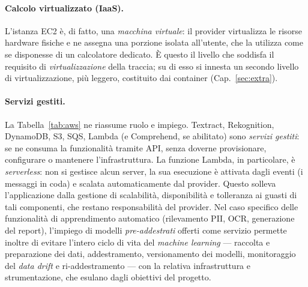 \documentclass[11pt,a4paper]{article}
\begin{document}
\paragraph{Calcolo virtualizzato (IaaS).} L'istanza EC2 è, di fatto, una \emph{macchina
virtuale}: il provider virtualizza le risorse hardware fisiche e ne assegna una
porzione isolata all'utente, che la utilizza come se disponesse di un calcolatore
dedicato. È questo il livello che soddisfa il requisito di \emph{virtualizzazione}
della traccia; su di esso si innesta un secondo livello di virtualizzazione, più
leggero, costituito dai container (Cap.~\ref{sec:extra}).

\paragraph{Servizi gestiti.} La Tabella~\ref{tab:aws} ne riassume ruolo e impiego.
Textract, Rekognition, DynamoDB, S3, SQS, Lambda (e Comprehend, se abilitato) sono
\emph{servizi gestiti}: se ne consuma la funzionalità tramite API, senza doverne
provisionare, configurare o mantenere l'infrastruttura. La funzione Lambda, in
particolare, è \emph{serverless}: non si gestisce alcun server, la sua esecuzione è
attivata dagli eventi (i messaggi in coda) e scalata automaticamente dal provider. Questo solleva l'applicazione
dalla gestione di scalabilità, disponibilità e tolleranza ai guasti di tali componenti,
che restano responsabilità del provider. Nel caso specifico delle funzionalità di
apprendimento automatico (rilevamento PII, OCR, generazione del report), l'impiego di
modelli \emph{pre-addestrati} offerti come servizio permette inoltre di evitare
l'intero ciclo di vita del \emph{machine learning} --- raccolta e preparazione dei dati,
addestramento, versionamento dei modelli, monitoraggio del \emph{data drift} e
ri-addestramento --- con la relativa infrastruttura e strumentazione, che esulano dagli
obiettivi del progetto.
\end{document}
